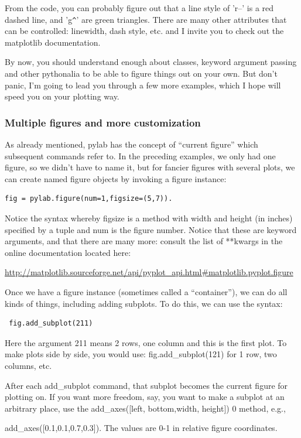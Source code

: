 \documentclass[11pt]{book}
\begin{document}
{{{\noindent   From the code, you can probably figure out that a line style of 'r--' is a red dashed line,  and 'g\verb|^|'  are green triangles.  
There are many other attributes that can be controlled: linewidth, dash style, etc. and I invite you to check out the {\color{blue}matplotlib} documentation.

\noindent By now, you should understand enough about classes, keyword argument passing and other pythonalia to be able to figure things out on your own.   But don't panic, I'm going to lead you through a few more examples, which I hope will speed you on your plotting way.  



\subsubsection{Multiple figures and more customization}
As already mentioned,  {\color{blue}pylab} has the concept of ``current figure'' which subsequent commands refer to.   In the preceding examples, we only had one figure, so we didn't have to name it, but for fancier figures with several plots, we 
can create  named figure objects by invoking a {\color{blue}figure} instance: 
 
 {\color{blue}\begin{verbatim}
fig = pylab.figure(num=1,figsize=(5,7)). 
\end{verbatim}}

\noindent  Notice the syntax whereby {\color{blue} figsize}  is a method with  width and height (in inches) specified by a tuple and {\color{blue}num}  is the figure number.    Notice that these are keyword arguments, and that there are many more:  consult the list of  **kwargs in the online documentation  located here:

\url{http://matplotlib.sourceforge.net/api/pyplot_api.html#matplotlib.pyplot.figure }

Once we have a figure instance (sometimes called a ``container''), we can do all kinds of things, including adding subplots.  To do this, we can use the syntax:

{\color{blue}\begin{verbatim}
 fig.add_subplot(211) 
 \end{verbatim}}
 \noindent Here the 
argument  211 means 2 rows, one column and this is the first plot.  To make plots side by side, you would use: {\color{blue} fig.add\_subplot(121) } for  1 row, two columns, etc.  

After each {\color{blue}add\_subplot} command, that subplot becomes the current figure for plotting on.
If you want more freedom, say, you want to make a subplot at an arbitrary place,  use the {\color{blue}add\_axes([left, bottom,width, height])} 0 method, e.g.,  {{\color{blue}add\_axes([0.1,0.1,0.7,0.3])}.  The values are 0-1 in relative figure coordinates. 

}}}}
\end{document}
